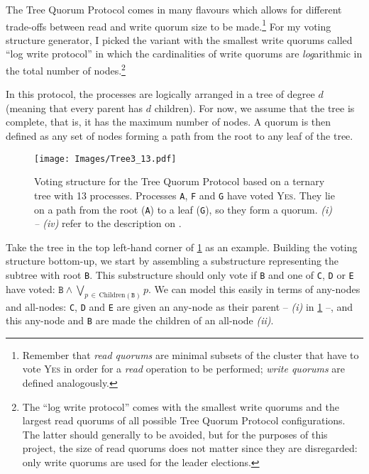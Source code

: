\documentclass[12pt,chapterprefix=true,toc=bibliography,numbers=noendperiod,
               footnotes=multiple,twoside]{scrreprt}
\newcommand{\yes}{{\fontfamily{jkposn}\selectfont\textsc{Yes}}}
\begin{document}
The Tree Quorum Protocol \autocite{tree} comes in many flavours which allows for different trade-offs between read and write quorum size to be made.\footnote{Remember that \emph{read quorums} are minimal subsets of the cluster that have to vote \yes{} in order for a \emph{read} operation to be performed; \emph{write quorums} are defined analogously.} For my voting structure generator, I picked the variant with the smallest write quorums called \enquote{log write protocol} in which the cardinalities of write quorums are \emph{log}arithmic in the total number of nodes.\footnote{The \enquote{log write protocol} comes with the smallest write quorums and the largest read quorums of all possible Tree Quorum Protocol configurations. The latter should generally to be avoided, but for the purposes of this project, the size of read quorums does not matter since they are disregarded: only write quorums are used for the leader elections.}

In this protocol, the processes are logically arranged in a tree of degree \(d\) (meaning that every parent has \(d\) children). For now, we assume that the tree is complete, that is, it has the maximum number of nodes. A quorum is then defined as any set of nodes forming a path from the root to any leaf of the tree.

\begin{figure}[h]
    \centering
    \texttt{[image: Images/Tree3\_13.pdf]}
    \caption{Voting structure for the Tree Quorum Protocol based on a ternary tree with 13 processes. Processes \texttt{A}, \texttt{F} and \texttt{G} have voted \yes. They lie on a path from the root (\texttt{A}) to a leaf (\texttt{G}), so they form a quorum. \emph{(i) -- (iv)} refer to the description on .}
    \label{fig:grid3_13}
\end{figure}

Take the tree in the top left-hand corner of \cref{fig:grid3_13} as an example. \label{p:tree-explanation}Building the voting structure bottom-up, we start by assembling a substructure representing the subtree with root \texttt{B}. This substructure should only vote if \texttt{B} and one of \texttt{C}, \texttt{D} or \texttt{E} have voted: \( \texttt{B} \wedge \bigvee_{p\,\in\,\text{Children}(\texttt{B})} p \). We can model this easily in terms of any-nodes and all-nodes: \texttt{C}, \texttt{D} and \texttt{E} are given an any-node as their parent -- \emph{(i)} in \cref{fig:grid3_13} --, and this any-node and \texttt{B} are made the children of an all-node \emph{(ii)}.
\end{document}
